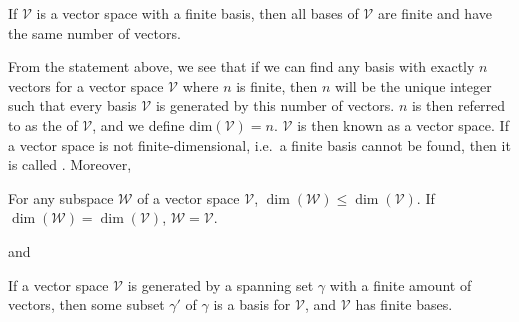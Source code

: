 \begin{proper}
\label{proper:samenvecsbases}
If $\mathcal{V}$ is a vector space with a finite basis, then all bases of $\mathcal{V}$ are finite and have the same number of vectors.
\end{proper}
From the statement above, we see that if we can find any basis with exactly $n$ vectors for a vector space $\mathcal{V}$ where $n$ is finite, then $n$ will be the unique integer such that every basis $\mathcal{V}$ is generated by this number of vectors. $n$ is then referred to as the  of $\mathcal{V}$, and we define $\text{dim}(\mathcal{V}) = n$. $\mathcal{V}$ is then known as a  vector space. If a vector space is not finite-dimensional, i.e.\ a finite basis cannot be found, then it is called . Moreover,
\begin{proper}
\label{proper:dimWleqV}
For any subspace $\mathcal{W}$ of a vector space $\mathcal{V}$, $\dim(\mathcal{W}) \leq \dim(\mathcal{V})$. If $\dim(\mathcal{W}) = \dim(\mathcal{V})$, $\mathcal{W} = \mathcal{V}$.
\end{proper}
and
\begin{thm}
\label{thm:finitebasissubset}
If a vector space $\mathcal{V}$ is generated by a spanning set $\mathcal{\gamma}$ with a finite amount of vectors, then some subset $\mathcal{\gamma'}$ of $\mathcal{\gamma}$ is a basis for $\mathcal{V}$, and $\mathcal{V}$ has finite bases.
\end{thm}
